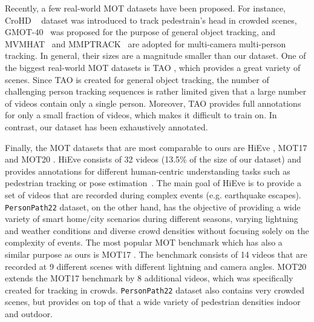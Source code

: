 \documentclass[runningheads]{llncs}
\begin{document}
Recently, a few real-world MOT datasets have been proposed. For instance, CroHD ~\cite{CroHD} dataset was introduced to track pedestrain's head in crowded scenes, GMOT-40~\cite{gmot40} was proposed for the purpose of general object tracking, and 
MVMHAT~\cite{mvmhat} and MMPTRACK~\cite{mmptrack} are adopted for multi-camera multi-person tracking. In general, their sizes are a magnitude smaller than our dataset. One of the biggest real-world MOT datasets is TAO \cite{tao}, which provides a great variety of scenes. Since TAO is created for general object tracking, the number of challenging person tracking sequences is rather limited given that a large number of videos contain only a single person. Moreover, TAO provides full annotations for only a small fraction of videos, which makes it difficult to train on. 
In contrast, our dataset has been exhaustively annotated. 


Finally, the MOT datasets that are most comparable to ours are HiEve \cite{hieve}, MOT17 \cite{mot} and MOT20 \cite{mot20}. HiEve consists of 32 videos (13.5\% of the size of our dataset) and provides annotations for different human-centric understanding tasks such as pedestrian tracking or pose estimation~\cite{song2021human,liu2021recent,chang2020towards}. The main goal of HiEve is to provide a set of videos that are recorded during complex events (e.g. earthquake escapes). 
\texttt{PersonPath22} dataset, on the other hand, has the objective of providing a wide variety of smart home/city scenarios during different seasons, varying lightning and weather conditions and diverse crowd densities without focusing solely on the complexity of events. 
The most popular MOT benchmark which has also a similar purpose as ours is MOT17 \cite{mot}. The benchmark consists of 14 videos that are recorded at 9 different scenes with different lightning and camera angles. MOT20 \cite{mot} extends the MOT17 benchmark by 8 additional videos, which was specifically created for tracking in crowds. \texttt{PersonPath22} dataset also contains very crowded scenes, but provides on top of that a wide variety of pedestrian densities indoor and outdoor. 
\end{document}
